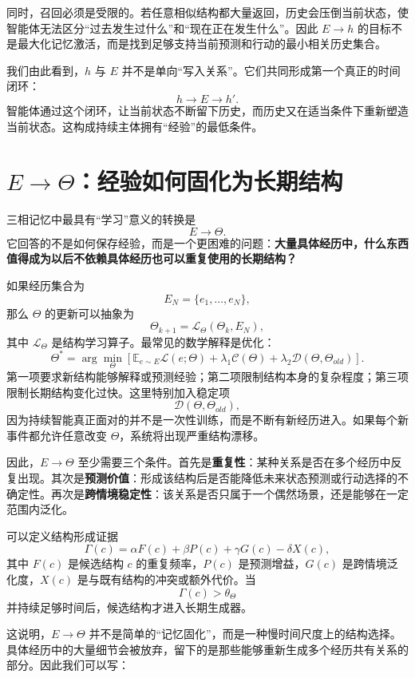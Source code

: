 同时，召回必须是受限的。若任意相似结构都大量返回，历史会压倒当前状态，使智能体无法区分“过去发生过什么”和“现在正在发生什么”。因此 $E\rightarrow h$ 的目标不是最大化记忆激活，而是找到足够支持当前预测和行动的最小相关历史集合。

我们由此看到，$h$ 与 $E$ 并不是单向“写入关系”。它们共同形成第一个真正的时间闭环：
\[
\boxed{
h
\rightarrow
E
\rightarrow
h'.
}
\]
智能体通过这个闭环，让当前状态不断留下历史，而历史又在适当条件下重新塑造当前状态。这构成持续主体拥有“经验”的最低条件。

\section{$E\rightarrow\Theta$：经验如何固化为长期结构}

三相记忆中最具有“学习”意义的转换是
\[
\boxed{
E\rightarrow\Theta.
}
\]
它回答的不是如何保存经验，而是一个更困难的问题：\textbf{大量具体经历中，什么东西值得成为以后不依赖具体经历也可以重复使用的长期结构？}

如果经历集合为
\[
E_N
=
\{e_1,\ldots,e_N\},
\]
那么 $\Theta$ 的更新可以抽象为
\[
\Theta_{k+1}
=
\mathcal L_{\Theta}
\left(
\Theta_k,
E_N
\right),
\]
其中 $\mathcal L_{\Theta}$ 是结构学习算子。最常见的数学解释是优化：
\[
\Theta^\ast
=
\arg\min_\Theta
\left[
\mathbb{E}_{e\sim E}
\mathcal L(e;\Theta)
+
\lambda_1
\mathcal C(\Theta)
+
\lambda_2
\mathcal D(\Theta,\Theta_{old})
\right].
\]
第一项要求新结构能够解释或预测经验；第二项限制结构本身的复杂程度；第三项限制长期结构变化过快。这里特别加入稳定项
\[
\mathcal D(\Theta,\Theta_{old}),
\]
因为持续智能真正面对的并不是一次性训练，而是不断有新经历进入。如果每个新事件都允许任意改变 $\Theta$，系统将出现严重结构漂移。

因此，$E\rightarrow\Theta$ 至少需要三个条件。首先是\textbf{重复性}：某种关系是否在多个经历中反复出现。其次是\textbf{预测价值}：形成该结构后是否能降低未来状态预测或行动选择的不确定性。再次是\textbf{跨情境稳定性}：该关系是否只属于一个偶然场景，还是能够在一定范围内泛化。

可以定义结构形成证据
\[
\Gamma(c)
=
\alpha F(c)
+
\beta P(c)
+
\gamma G(c)
-
\delta X(c),
\]
其中 $F(c)$ 是候选结构 $c$ 的重复频率，$P(c)$ 是预测增益，$G(c)$ 是跨情境泛化度，$X(c)$ 是与既有结构的冲突或额外代价。当
\[
\Gamma(c)>\theta_\Theta
\]
并持续足够时间后，候选结构才进入长期生成器。

这说明，$E\rightarrow\Theta$ 并不是简单的“记忆固化”，而是一种慢时间尺度上的结构选择。具体经历中的大量细节会被放弃，留下的是那些能够重新生成多个经历共有关系的部分。因此我们可以写：
\begin{statementbox}
\centering
{}
\end{statementbox}

